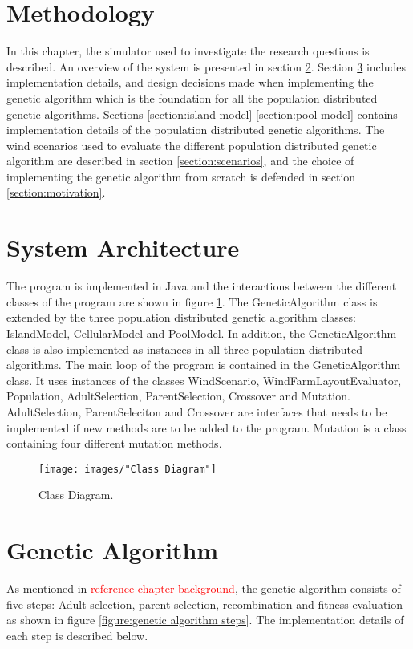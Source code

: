 \documentclass{article}
\begin{document}
\section{Methodology}\label{chapter:methodology}%
In this chapter, the simulator used to investigate the research questions is described. An overview of the system is presented in section \ref{section:systemt architecture}. Section \ref{section:genetic algorithm} includes implementation details, and design decisions made when implementing the genetic algorithm which is the foundation for all the population distributed genetic algorithms. Sections \ref{section:island model}-\ref{section:pool model} contains implementation details of the population distributed genetic algorithms. The wind scenarios used to evaluate the different population distributed genetic algorithm are described in section \ref{section:scenarios}, and the choice of implementing the genetic algorithm from scratch is defended in section \ref{section:motivation}.


\section{System Architecture}\label{section:systemt architecture}
The program is implemented in Java and the interactions between the different classes of the program are shown in figure \ref{figure:class diagram}. The GeneticAlgorithm class is extended by the three population distributed genetic algorithm classes: IslandModel, CellularModel and PoolModel. In addition, the GeneticAlgorithm class is also implemented as instances in all three population distributed algorithms. The main loop of the program is contained in the GeneticAlgorithm class. It uses instances of the classes WindScenario, WindFarmLayoutEvaluator, Population, AdultSelection, ParentSelection, Crossover and Mutation. AdultSelection, ParentSeleciton and Crossover are interfaces that needs to be implemented if new methods are to be added to the program. Mutation is a class containing four different mutation methods. 


\begin{figure}[h!]
\begin{center}
\texttt{[image: images/"Class Diagram"]}
\caption{Class Diagram.}
\label{figure:class diagram}
\end{center}
\end{figure}


\section{Genetic Algorithm}\label{section:genetic algorithm}
As mentioned in \textcolor{red}{reference chapter background}, the genetic algorithm consists of five steps: Adult selection, parent selection, recombination and fitness evaluation as shown in figure \ref{figure:genetic algorithm steps}. The implementation details of each step is described below.
\end{document}
